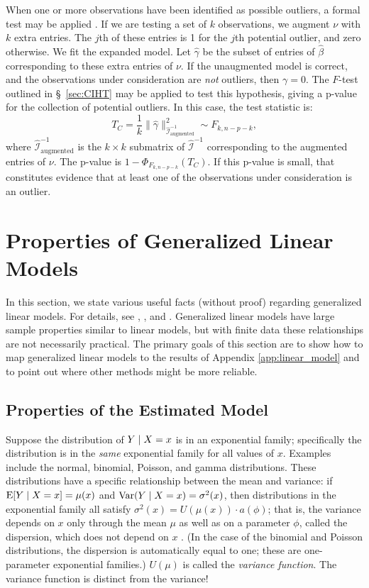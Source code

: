 \documentclass[12pt]{article}
\DeclareMathOperator{\Exp}{\operatorname{E}}
\DeclareMathOperator{\Var}{\operatorname{Var}}
\begin{document}
When one or more observations have been identified as possible outliers, a formal test may be applied \cite[\S~10.6.4]{Seber:2003}. If we are testing a set of $k$ observations, we augment $\nu$ with $k$ extra entries. The $j$th of these entries is 1 for the $j$th potential outlier, and zero otherwise. We fit the expanded model. Let $\hat{\gamma}$ be the subset of entries of $\hat{\beta}$ corresponding to these extra entries of $\nu$. If the unaugmented model is correct, and the observations under consideration are \textit{not} outliers, then $\gamma = 0$. The $F$-test outlined in \S~\ref{sec:CIHT} may be applied to test this hypothesis, giving a p-value for the collection of potential outliers. In this case, the test statistic is:
\begin{displaymath}
   T_C = \frac{1}{k} \| \hat{\gamma} \|_{\hat{\mathcal{I}}_{\textrm{augmented}}^{-1}}^2 \sim F_{k, n-p-k},
\end{displaymath}
where $\hat{\mathcal{I}}_{\textrm{augmented}}^{-1}$ is the $k \times k$ submatrix of $\hat{\mathcal{I}}^{-1}$ corresponding to the augmented entries of $\nu$. The p-value is $1 - \Phi_{F_{k, n-p-k}}(T_C)$. If this p-value is small, that constitutes evidence that at least one of the observations under consideration is an outlier.

\section{Properties of Generalized Linear Models}
\label{app:glm}

In this section, we state various useful facts (without proof) regarding generalized linear models. For details, see \cite{MN:1983}, \cite{Wood:2017}, and \cite{Agresti:2012}. Generalized linear models have large sample properties similar to linear models, but with finite data these relationships are not necessarily practical. The primary goals of this section are to show how to map generalized linear models to the results of Appendix \ref{app:linear_model} and to point out where other methods might be more reliable.

\subsection{Properties of the Estimated Model}

Suppose the distribution of $Y \; | \; X = x$ is in an exponential family; specifically the distribution is in the \emph{same} exponential family for all values of $x$. Examples include the normal, binomial, Poisson, and gamma distributions. These distributions have a specific relationship between the mean and variance: if $\Exp [Y \given X = x] = \mu(x)$ and $\Var(Y \given X = x) = \sigma^2 (x)$, then distributions in the exponential family all satisfy $\sigma^2(x) = U(\mu(x)) \cdot a(\phi)$; that is, the variance depends on $x$ only through the mean $\mu$ as well as on a parameter $\phi$, called the dispersion, which does not depend on $x$ \cite[\S 2.2.2]{MN:1983}. (In the case of the binomial and Poisson distributions, the dispersion is automatically equal to one; these are one-parameter exponential families.) $U(\mu)$ is called the \emph{variance function}. The variance function is distinct from the variance!
\end{document}

